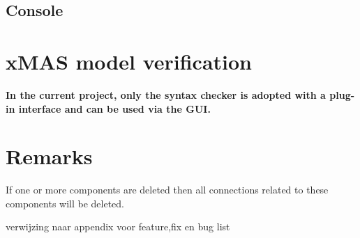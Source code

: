 \subsection{Console}



\section{xMAS model verification}
\begin{tcolorbox}[colback=white]
\textbf{
In the current project, only the syntax checker is adopted with a plug-in
interface and can be used via the GUI.
}
\end{tcolorbox}



\section{Remarks}


If one or more components are deleted then all connections related to these
components will be deleted.

\begin{tcolorbox}[colback=yellow!30]
 verwijzing naar appendix voor feature,fix en bug list
\end{tcolorbox}




